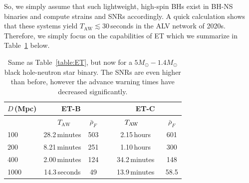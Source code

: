 \documentclass[prd,amsmath,amssymb,aps,floats,amsfonts,notitlepage,superscriptaddress,eqsecnum,nofootinbib,10pt]{revtex4-1}
\newcommand\T{\rule{0pt}{2.6ex}}       %
\newcommand\B{\rule[-1.2ex]{0pt}{0pt}} %
\begin{document}
So, we simply assume that such lightweight, high-spin BHs exist in BH-NS binaries and compute strains and SNRs accordingly.
A quick calculation shows that these systems yield $T_\text{AW} \lesssim 30\,$seconds in the ALV network of 2020s. %
Therefore, we simply focus on the capabilities of ET which we summarize in Table~\ref{table:ET_BH_NS} below.
%
%
%
\begin{table}[h]
\centering
\begin{tabular}{l|ccccc}
\hline
$D\,$(Mpc) & \multicolumn{2}{c}{ET-B} &  & \multicolumn{2}{c}{ET-C}\T\B\\
\hline
{}&  \ \hspace{6mm}$T_\text{AW}$ \hspace{8mm} & $\bar{\rho}_{F}$ &{}  & $\hspace{6mm}T_\text{AW} \hspace{10mm}$ & $\bar{\rho}_{F}$\T\B\\

100 &   28.2\,minutes & 503 &{\qquad} &  2.15\,hours & 601\T\\
200 & 8.21\,minutes & 251  &{\qquad} & 1.10\,hours & 300 \\
400 &  2.00\,minutes & 124 &{\qquad} & 34.2\,minutes & 148\\
1000 & 14.3\,seconds & 49 &{\qquad} & 13.9\,minutes& 58.5\\
\hline
\end{tabular}
\caption{Same as Table~\ref{table:ET}, but now for a $5 M_\odot- 1.4 M_\odot$ black hole-neutron star binary.
The SNRs are even higher than before, however the advance warning times have decreased significantly.}\label{table:ET_BH_NS}
\end{table}
%
%
\end{document}
